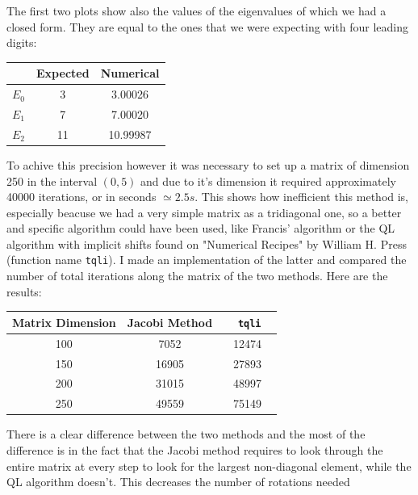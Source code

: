 \documentclass[10pt,a4paper,titlepage]{article}
\begin{document}
The first two plots show also the values of the eigenvalues of which we had a closed form. They are equal to the ones that we were expecting with four
leading digits:\\
\begin{center}
\begin{tabular}{|c|c|c|}
\hline
       &  Expected &  Numerical\\\hline
$E_0$  &         3 &  3.00026  \\\hline
$E_1$  &         7 &  7.00020  \\\hline
$E_2$  &        11 & 10.99987  \\\hline
\end{tabular}
\end{center}
To achive this precision however it was necessary to set up a matrix of dimension 250 in the interval $(0,5)$ and due to it's dimension it required 
approximately 40000 iterations, or in seconds $\simeq 2.5 s$. This shows how inefficient this method is, especially beacuse we had a very simple matrix
as a tridiagonal one, so a better and specific algorithm could have been used, like Francis' algorithm or the QL algorithm with implicit shifts found
on "Numerical Recipes" by William H. Press (function name \texttt{tqli}). I made an implementation of the latter and compared the number of total 
iterations along the matrix of the two methods. Here are the results:\\
\begin{center}
\begin{tabular}{|c|c|c|}
\hline
Matrix Dimension  &  Jacobi Method &  $~~~~$ \texttt{tqli}$~~~~$ \\\hline
100  &   7052  &  12474  \\\hline
150  &   16905 &  27893  \\\hline
200  &   31015 &  48997  \\\hline
250  &   49559 &  75149  \\\hline
\end{tabular}
\end{center}
There is a clear difference between the two methods and the most of the difference is in the fact that the Jacobi method requires to look through the 
entire matrix at every step to look for the largest non-diagonal element, while the QL algorithm doesn't. This decreases the number of rotations needed
\end{document}
